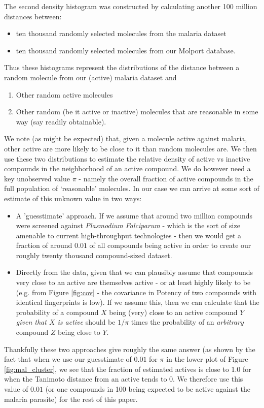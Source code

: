 \documentclass{article}
\begin{document}
The second density histogram was constructed by calculating another 100 million distances between:
\begin{itemize}
    \item ten thousand randomly selected molecules from the malaria dataset
    \item ten thousand randomly selected molecules from our Molport database.
\end{itemize}
Thus these histograms represent the distributions of the distance between a random molecule from our (active) malaria dataset and 
\begin{enumerate}
    \item Other random active molecules
    \item Other random (be it active or inactive) molecules that are reasonable in some way (say readily obtainable).
\end{enumerate}
We note (as might be expected) that, given a molecule active against malaria, other active are more likely to be close to it than random molecules are.
\newline
\newline
We then use these two distributions to estimate the relative density of active vs inactive compounds in the neighborhood of an active compound.
We do however need a key unobserved value $\pi$ - namely the overall fraction of active compounds in the full population of `reasonable' molecules.  In our case we can arrive at some sort of estimate of this unknown value in two ways:
\begin{itemize}
    \item A 'guesstimate' approach. If we assume that around two million compounds were screened against \textit{Plasmodium Falciparum} - which is the sort of size amenable to current high-throughput technologies\cite{PaweSzymanskiMagdalenaMarkowicz2012} - then we would get a fraction of around $0.01$ of all compounds being active in order to create our roughly twenty thousand compound-sized dataset.
    \item Directly from the data, given that we can plausibly assume that compounds very close to an active are themselves active - or at least highly likely to be (e.g. from Figure \ref{fig:cov} - the covariance in Potency of two compounds with identical fingerprints is low).  If we assume this, then we can calculate that the probability of a compound $X$ being (very) close to an active compound $Y$ \textit{given that $X$ is active} should be $1/\pi$ times the probability of an \textit{arbitrary} compound $Z$ being close to $Y$.
\end{itemize}
Thankfully these two approaches give roughly the same answer (as shown by the fact that when we use our guesstimate of $0.01$ for $\pi$ in the lower plot of Figure \ref{fig:mal_cluster}, we see that the fraction of estimated actives is close to 1.0 for when the Tanimoto distance from an active tends to 0.  We therefore use this value of $0.01$ (or one compounds in 100 being expected to be active against the malaria parasite) for the rest of this paper. 
\end{document}
